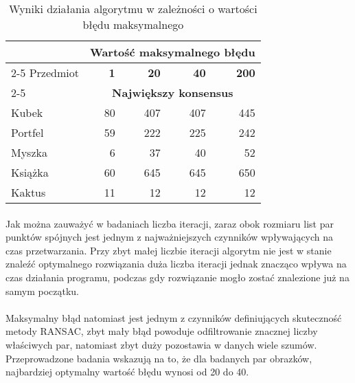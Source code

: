 \documentclass[../main.tex]{subfiles}
\begin{document}
    \begin{table}[H]
    \caption{Wyniki działania algorytmu w zależności o wartości błędu maksymalnego}
     \label{t:errs}
     \begin{center}
        \begin{tabular}{|l|r|r|r|r|}
            \hline
            \multirow{2}{*}{{}} &
            \multicolumn{4}{c|}{\textbf{Wartość maksymalnego błędu}} \\
            
            \cline{2-5}
            {Przedmiot} & \textbf{1} & \textbf{20} & \textbf{40} & \textbf{200} \\
            \cline{2-5}
            {} & \multicolumn{4}{c|}{\textbf{Największy konsensus}} \\
            
             \hline
             {Kubek} & {80} & {407} & {407} & {445} \\
             \hline
             {Portfel} & {59} & {222} & {225} & {242}  \\
             \hline
             {Myszka} & {6} & {37} & {40} & {52}  \\
             \hline
             {Książka} & {60} & {645} & {645} & {650}  \\
             \hline
             {Kaktus} & {11} & {12} & {12} & {12} \\
            \hline
        \end{tabular}
     \end{center}
    \end{table}
   
   \paragraph{}
   Jak można zauważyć w badaniach liczba iteracji, zaraz obok rozmiaru list par punktów spójnych jest jednym z najważniejszych czynników wpływających na czas przetwarzania. Przy zbyt małej liczbie iteracji algorytm nie jest w stanie znaleźć optymalnego rozwiązania duża liczba iteracji jednak znacząco wpływa na czas działania programu, podczas gdy rozwiązanie mogło zostać znalezione już na samym początku.
   
   \paragraph{}
   Maksymalny błąd natomiast jest jednym z czynników definiujących skuteczność metody RANSAC, zbyt mały błąd powoduje odfiltrowanie znacznej liczby właściwych par, natomiast zbyt duży pozostawia w danych wiele szumów. Przeprowadzone badania wskazują na to, że dla badanych par obrazków, najbardziej optymalny wartość błędu wynosi od 20 do 40.
   
\end{document}
